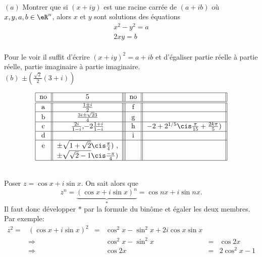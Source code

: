 \\
$(a)$ { Montrer que si $(x+iy)$ est une racine carrée de $(a+ib)$ o\`{u} $x, y, a, b \in \eR^n$, alors $x$ et $y$ sont solutions des équations }
\[ \begin{array}{c} x^2-y^2=a\\ 
             			2xy=b \end{array}\]
\\


\noindent Pour le voir il suffit d'écrire $(x+iy)^2 = a+ib$ et d'égaliser partie réelle à partie réelle, partie imaginaire à partie imaginaire.\\
$(b)$\hspace{0,3cm} $\pm(\frac{\sqrt 2 }{2}(3+i))$

\[ \begin{tabular}{| c || c || | c | | c | |}
\hline  no &         ${ 5}                                                         $ 		   & no     &                            	           \\    \hline \hline
           a   &  $    \frac{1\pm i}{2}                    $  				            & f 	 	&   		                    \\ \hline 
           b  &      $ \frac{3i \pm \sqrt23}{4}                                       $   	   & g  &            		          \\ \hline
           c   &      $\frac{2i}{1-i}$,$-2\frac{1+i}{1-i}                      $   		   & h  & $-2+2^{1/5} \cis\frac{\pi}{15}+\frac{2k\pi}{5})	 $   				    \\ \hline 
           d   &      $                             $   			  	   & i &   		    \\ \hline 
         e   &      $\pm\sqrt{1+\sqrt2}\cis \frac{\pi}{4}) $ ,    						   &   &     	 	\\
              &      $\pm\sqrt{\sqrt2-1}\cis \frac{-\pi}{4})   $   						   &   &                \\ \hline
          \end{tabular} \]
          
          \\
          
          
\noindent Poser $z=\cos x + i\sin x$. On sait alors que \[z^n=\underbrace{(\cos x+i\sin x)^n}_*=\cos nx + i \sin nx.\] Il faut donc développer $*$ par la formule du binôme et égaler les deux membres. Par exemple:\[\begin{array}{cccrcc}
               						z^2= & (\cos x+i\sin x)^2 & = & \cos^2 x-\sin^2 x+2i\cos x\sin x &   & \\
							          & 	\Longrightarrow    &    &          \cos^2 x-\sin^2 x       	&= &	\cos2x \\
							           & 	\Longrightarrow    &      &          \cos2x    	&= &	 2\cos^2x-1\end{array}\]

